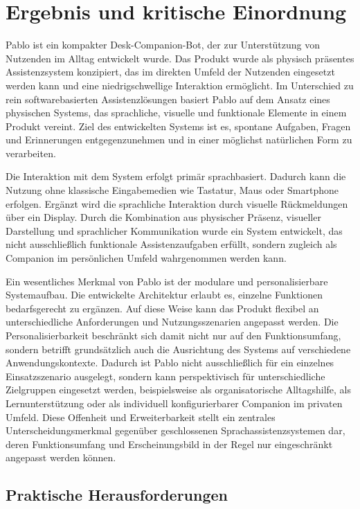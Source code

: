 \section{Ergebnis und kritische Einordnung}

Pablo ist ein kompakter Desk-Companion-Bot, der zur Unterstützung von Nutzenden im Alltag entwickelt wurde. 
Das Produkt wurde als physisch präsentes Assistenzsystem konzipiert, das im direkten Umfeld der Nutzenden eingesetzt werden kann und eine niedrigschwellige Interaktion ermöglicht. 
Im Unterschied zu rein softwarebasierten Assistenzlösungen basiert Pablo auf dem Ansatz eines physischen Systems, das sprachliche, visuelle und funktionale Elemente in einem Produkt vereint. 
Ziel des entwickelten Systems ist es, spontane Aufgaben, Fragen und Erinnerungen entgegenzunehmen und in einer möglichst natürlichen Form zu verarbeiten.

Die Interaktion mit dem System erfolgt primär sprachbasiert. 
Dadurch kann die Nutzung ohne klassische Eingabemedien wie Tastatur, Maus oder Smartphone erfolgen. 
Ergänzt wird die sprachliche Interaktion durch visuelle Rückmeldungen über ein Display.
Durch die Kombination aus physischer Präsenz, visueller Darstellung und sprachlicher Kommunikation wurde ein System entwickelt, das nicht ausschließlich funktionale Assistenzaufgaben erfüllt, sondern zugleich als Companion im persönlichen Umfeld wahrgenommen werden kann.

Ein wesentliches Merkmal von Pablo ist der modulare und personalisierbare Systemaufbau. 
Die entwickelte Architektur erlaubt es, einzelne Funktionen bedarfsgerecht zu ergänzen. 
Auf diese Weise kann das Produkt flexibel an unterschiedliche Anforderungen und Nutzungsszenarien angepasst werden. 
Die Personalisierbarkeit beschränkt sich damit nicht nur auf den Funktionsumfang, sondern betrifft grundsätzlich auch die Ausrichtung des Systems auf verschiedene Anwendungskontexte. 
Dadurch ist Pablo nicht ausschließlich für ein einzelnes Einsatzszenario ausgelegt, sondern kann perspektivisch für unterschiedliche Zielgruppen eingesetzt werden, beispielsweise als organisatorische Alltagshilfe, als Lernunterstützung oder als individuell konfigurierbarer Companion im privaten Umfeld. 
Diese Offenheit und Erweiterbarkeit stellt ein zentrales Unterscheidungsmerkmal gegenüber geschlossenen Sprachassistenzsystemen dar, deren Funktionsumfang und Erscheinungsbild in der Regel nur eingeschränkt angepasst werden können.



\subsection{Praktische Herausforderungen}

